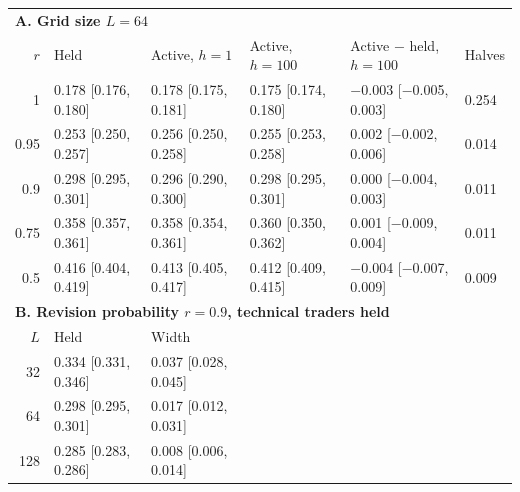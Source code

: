 \clearpage
\begin{center}
\begin{minipage}{\linewidth}\centering
\captionsetup{type=table,hypcap=false}
\caption{Revision timing. At each step, each interior trader adopted its rule's output with revision probability $r$ and otherwise kept its current intention; $r=1$ is the main model. Entries are the interpolated fraction $f_{50}$ at which half of 50 starting markets reached a Sell majority within 3,000 post-switch steps, with 95\% intervals in brackets from 2,000 bootstrap samples of whole starting markets, drawn once and shared by all conditions. Active $-$ held is the difference in $f_{50}$ at dealer depth $h=100$, from the same samples. Halves is the largest median, over the three tested fractions nearest the held $f_{50}$, of the absolute difference between the Sell fractions of the two checkerboard halves of the grid, averaged over five snapshots in the last 400 steps. Panel B uses technical traders held at dealer depth $h=100$ and revision probability $r=0.9$; the width is $f_{75}-f_{25}$. No no-switch control reached a Sell majority in any condition.}
\label{tab:variants-timing}
\scriptsize\setlength{\tabcolsep}{2.5pt}
\begin{tabular}{rlllll}
\toprule
\multicolumn{6}{l}{\textbf{A. Grid size $L=64$}} \\
$r$ & Held & Active, $h=1$ & Active, $h=100$ & Active $-$ held, $h=100$ & Halves \\
\midrule
1 & 0.178 [0.176, 0.180] & 0.178 [0.175, 0.181] & 0.175 [0.174, 0.180] & $-$0.003 [$-$0.005, 0.003] & 0.254 \\
0.95 & 0.253 [0.250, 0.257] & 0.256 [0.250, 0.258] & 0.255 [0.253, 0.258] & 0.002 [$-$0.002, 0.006] & 0.014 \\
0.9 & 0.298 [0.295, 0.301] & 0.296 [0.290, 0.300] & 0.298 [0.295, 0.301] & 0.000 [$-$0.004, 0.003] & 0.011 \\
0.75 & 0.358 [0.357, 0.361] & 0.358 [0.354, 0.361] & 0.360 [0.350, 0.362] & 0.001 [$-$0.009, 0.004] & 0.011 \\
0.5 & 0.416 [0.404, 0.419] & 0.413 [0.405, 0.417] & 0.412 [0.409, 0.415] & $-$0.004 [$-$0.007, 0.009] & 0.009 \\
\midrule
\multicolumn{6}{l}{\textbf{B. Revision probability $r=0.9$, technical traders held}} \\
$L$ & Held & Width & & & \\
\midrule
32 & 0.334 [0.331, 0.346] & 0.037 [0.028, 0.045] \\
64 & 0.298 [0.295, 0.301] & 0.017 [0.012, 0.031] \\
128 & 0.285 [0.283, 0.286] & 0.008 [0.006, 0.014] \\
\bottomrule
\end{tabular}
\end{minipage}
\end{center}

